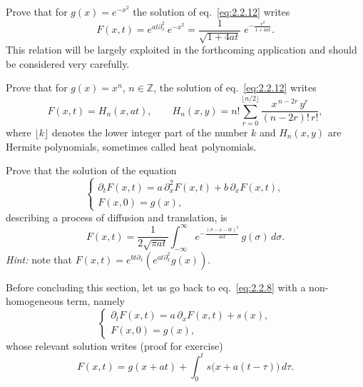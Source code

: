 \begin{exercise}
Prove that for $g(x)=e^{-x^{2}}$ the solution of eq.~\eqref{eq:2.2.12} writes
\begin{equation}
F(x,t)=e^{a t\partial_{x}^{2}}\,e^{-x^{2}}
=\frac{1}{\sqrt{1+4 a t}}\;e^{-\frac{x^{2}}{1+4 a t}}.
\label{eq:2.2.18}
\end{equation}
This relation will be largely exploited in the forthcoming application and should be considered very carefully.
\end{exercise}

\begin{exercise}
Prove that for $g(x)=x^{n}$, $n\in\mathbb{Z}$, the solution of eq.~\eqref{eq:2.2.12} writes
\begin{equation}
F(x,t)=H_{n}(x,a t),\qquad
H_{n}(x,y)=n!\sum_{r=0}^{\lfloor n/2\rfloor}
\frac{x^{\,n-2r}\,y^{r}}{(n-2r)!\,r!},
\label{eq:2.2.19}
\end{equation}
where $\lfloor k\rfloor$ denotes the lower integer part of the number $k$ and $H_{n}(x,y)$ are Hermite polynomials, sometimes called heat polynomials.
\end{exercise}

\begin{exercise}
Prove that the solution of the equation
\begin{equation}
\begin{cases}
\partial_{t}F(x,t)=a\,\partial_{x}^{2}F(x,t)+b\,\partial_{x}F(x,t),\\[1mm]
F(x,0)=g(x),
\end{cases}
\label{eq:2.2.20}
\end{equation}
describing a process of diffusion and translation, is
\begin{equation}
F(x,t)=\frac{1}{2\sqrt{\pi a t}}
\int_{-\infty}^{\infty}
e^{-\frac{(\sigma-x-bt)^{2}}{4 a t}}\,g(\sigma)\,d\sigma.
\label{eq:2.2.21}
\end{equation}
\textit{Hint:} note that $F(x,t)=e^{b t\partial_{x}}\!\left(e^{a t\partial_{x}^{2}}g(x)\right)$.
\end{exercise}

Before concluding this section, let us go back to eq.~\eqref{eq:2.2.8} with a non-homogeneous term, namely
\begin{equation}
\begin{cases}
\partial_{t}F(x,t)=a\,\partial_{x}F(x,t)+s(x),\\[1mm]
F(x,0)=g(x),
\end{cases}
\label{eq:2.2.22}
\end{equation}
whose relevant solution writes (proof for exercise)
\begin{equation}
F(x,t)=g(x+a t)+\int_{0}^{t}s\!\bigl(x+a(t-\tau)\bigr)\,d\tau.
\label{eq:2.2.23}
\end{equation}

